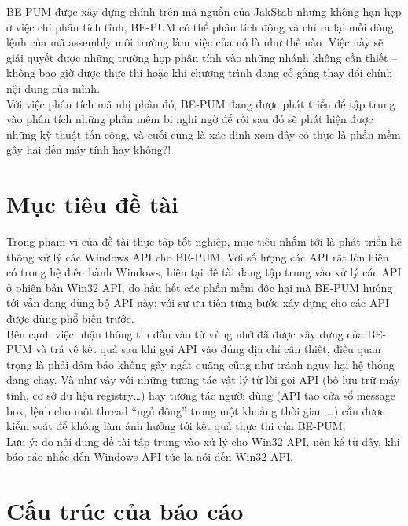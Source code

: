 \documentclass[14pt]{hcmutarticle}
\begin{document}
BE-PUM được xây dựng chính trên mã nguồn của JakStab nhưng không hạn hẹp ở việc chỉ phân tích tĩnh, BE-PUM có thể phân tích động và chỉ ra lại mỗi dòng lệnh của mã assembly môi trường làm việc của nó là như thế nào. Việc này sẽ giải quyết được những trường hợp phân tính vào những nhánh không cần thiết – không bao giờ được thực thi hoặc khi chương trình đang cố gắng thay đổi chính nội dung của mình.\\

Với việc phân tích mã nhị phân đó, BE-PUM đang được phát triển để tập trung vào phân tích những phần mềm bị nghi ngờ để rồi sau đó sẽ phát hiện được những kỹ thuật tấn công, và cuối cùng là xác định xem đây có thực là phần mềm gây hại đến máy tính hay không?!\\

\section{Mục tiêu đề tài}

Trong phạm vi của đề tài thực tập tốt nghiệp, mục tiêu nhắm tới là phát triển hệ thống xử lý các Windows API cho BE-PUM. Với số lượng các API rất lớn hiện có trong hệ điều hành Windows, hiện tại đề tài đang tập trung vào xử lý các API ở phiên bản Win32 API, do hầu hết các phần mềm độc hại mà BE-PUM hướng tới vẫn đang dùng bộ API này; với sự ưu tiên từng bước xây dựng cho các API được dùng phổ biến trước.\\

Bên cạnh việc nhận thông tin đầu vào từ vùng nhớ đã được xây dựng của BE-PUM và trả về kết quả sau khi gọi API vào đúng địa chỉ cần thiết, điều quan trọng là phải đảm bảo không gây ngắt quãng cũng như tránh nguy hại hệ thống đang chạy.
Và như vậy với những tương tác vật lý từ lời gọi API (bộ lưu trữ máy tính, cơ sở dữ liệu registry…) hay tương tác người dùng (API tạo cửa sổ message box, lệnh cho một thread “ngủ đông” trong một khoảng thời gian,…) cần được kiểm soát để không làm ảnh hưởng tới kết quả thực thi của BE-PUM.\\

Lưu ý: do nội dung đề tài tập trung vào xử lý cho Win32 API, nên kể từ đây, khi báo cáo nhắc đến Windows API tức là nói đến Win32 API.\\

\section{Cấu trúc của báo cáo}
\end{document}
